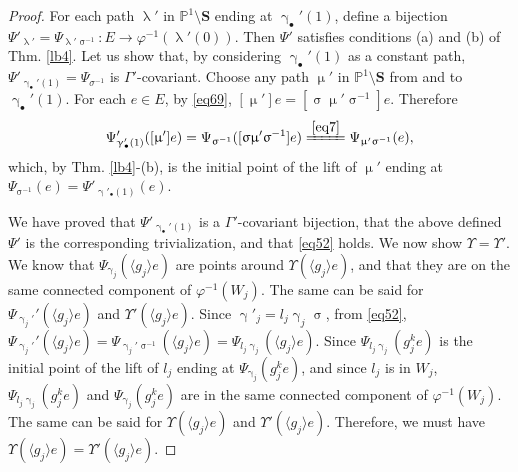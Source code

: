 \documentclass[11pt,b5paper,notitlepage]{article}
\theoremstyle{definition}
\theoremstyle{plain}
\newcommand{\bk}[1]{\langle {#1}\rangle}
\newcommand{\blt}{\bullet}
\newcommand{\Pbb}{\mathbb P}
\newcommand{\Sbf}{\mathbf{S}}
\numberwithin{equation}{subsection}
\begin{document}
\begin{proof}
For each path $\uplambda'$ in $\Pbb^1\setminus\Sbf$ ending at $\upgamma_\blt'(1)$, define a bijection $\Psi'_{\uplambda'}=\Psi_{\uplambda'\upsigma^{-1}}:E\rightarrow \varphi^{-1}(\uplambda'(0))$. Then $\Psi'$ satisfies conditions (a) and (b) of Thm. \ref{lb4}. Let us show that, by considering $\upgamma_\blt'(1)$ as a constant path, $\Psi'_{\upgamma_\blt'(1)}=\Psi_{\sigma^{-1}}$ is $\Gamma'$-covariant. Choose any path $\upmu'$ in $\Pbb^1\setminus\Sbf$ from and to $\upgamma_\blt'(1)$. For each $e\in E$, by \eqref{eq69}, $[\upmu']e=[\upsigma\upmu'\upsigma^{-1}]e$. Therefore
\begin{align*}
\Psi'_{\upgamma'_\blt(1)}([\upmu']e)=\Psi_{\upsigma^{-1}}([\upsigma\upmu'\upsigma^{-1}]e)\xlongequal{\eqref{eq7}} \Psi_{\upmu'\upsigma^{-1}}(e),
\end{align*}
which, by Thm. \ref{lb4}-(b), is the initial point of the lift of $\upmu'$ ending at 	$\Psi_{\upsigma^{-1}}(e)=\Psi'_{\upgamma'_\blt(1)}(e)$.


We have proved that $\Psi'_{\upgamma_\blt'(1)}$ is a $\Gamma'$-covariant bijection,  that the above defined $\Psi'$ is the corresponding trivialization, and that \eqref{eq52} holds. We now show $\Upsilon=\Upsilon'$. We know that $\Psi_{\upgamma_j}(\bk{g_j}e)$ are points around $\Upsilon(\bk{g_j}e)$, and that they are on the same connected component of $\varphi^{-1}(W_j)$. The same can be said for $\Psi_{\upgamma_j'}'(\bk{g_j}e)$ and $\Upsilon'(\bk{g_j}e)$. Since $\upgamma'_j=l_j\upgamma_j\upsigma$, from \eqref{eq52}, $\Psi_{\upgamma_j'}'(\bk{g_j}e)=\Psi_{\upgamma_j'\upsigma^{-1}}(\bk{g_j}e)=\Psi_{l_j\upgamma_j}(\bk{g_j}e)$.  Since $\Psi_{l_j\upgamma_j}(g_j^ke)$ is the initial point of the lift of $l_j$ ending at $\Psi_{\upgamma_j}(g_j^ke)$, and since $l_j$ is in $W_j$, $\Psi_{l_j\upgamma_j}(g_j^ke)$ and $\Psi_{\upgamma_j}(g_j^ke)$ are in the same connected component of  $\varphi^{-1}(W_j)$. The same can be said for $\Upsilon(\bk{g_j}e)$ and $\Upsilon'(\bk{g_j}e)$. Therefore, we must have $\Upsilon(\bk{g_j}e)=\Upsilon'(\bk{g_j}e)$. 
\end{proof}
\end{document}
